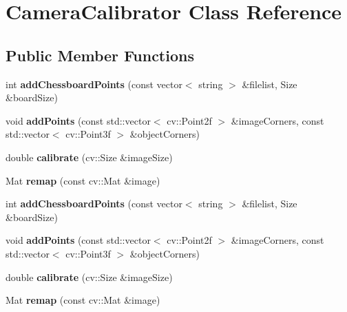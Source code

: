 \hypertarget{class_camera_calibrator}{\section{Camera\-Calibrator Class Reference}
\label{class_camera_calibrator}
}
\subsection*{Public Member Functions}
\begin{DoxyCompactItemize}
\item 
\hypertarget{class_camera_calibrator_a525d73f2da64eb204f7b18869366d3fb}{int {\bfseries add\-Chessboard\-Points} (const vector$<$ string $>$ \&filelist, Size \&board\-Size)}\label{class_camera_calibrator_a525d73f2da64eb204f7b18869366d3fb}

\item 
\hypertarget{class_camera_calibrator_afd58e42b53941ef5e1dade637f90f5b4}{void {\bfseries add\-Points} (const std\-::vector$<$ cv\-::\-Point2f $>$ \&image\-Corners, const std\-::vector$<$ cv\-::\-Point3f $>$ \&object\-Corners)}\label{class_camera_calibrator_afd58e42b53941ef5e1dade637f90f5b4}

\item 
\hypertarget{class_camera_calibrator_acf70d5b8a2e8eb17822e864ad936ae3f}{double {\bfseries calibrate} (cv\-::\-Size \&image\-Size)}\label{class_camera_calibrator_acf70d5b8a2e8eb17822e864ad936ae3f}

\item 
\hypertarget{class_camera_calibrator_af1b2cff3d345a70bbc5421c20847b14f}{Mat {\bfseries remap} (const cv\-::\-Mat \&image)}\label{class_camera_calibrator_af1b2cff3d345a70bbc5421c20847b14f}

\item 
\hypertarget{class_camera_calibrator_a525d73f2da64eb204f7b18869366d3fb}{int {\bfseries add\-Chessboard\-Points} (const vector$<$ string $>$ \&filelist, Size \&board\-Size)}\label{class_camera_calibrator_a525d73f2da64eb204f7b18869366d3fb}

\item 
\hypertarget{class_camera_calibrator_afd58e42b53941ef5e1dade637f90f5b4}{void {\bfseries add\-Points} (const std\-::vector$<$ cv\-::\-Point2f $>$ \&image\-Corners, const std\-::vector$<$ cv\-::\-Point3f $>$ \&object\-Corners)}\label{class_camera_calibrator_afd58e42b53941ef5e1dade637f90f5b4}

\item 
\hypertarget{class_camera_calibrator_acf70d5b8a2e8eb17822e864ad936ae3f}{double {\bfseries calibrate} (cv\-::\-Size \&image\-Size)}\label{class_camera_calibrator_acf70d5b8a2e8eb17822e864ad936ae3f}

\item 
\hypertarget{class_camera_calibrator_aecc1991d46487c6e305f95101e8f9bd2}{Mat {\bfseries remap} (const cv\-::\-Mat \&image)}\label{class_camera_calibrator_aecc1991d46487c6e305f95101e8f9bd2}

\end{DoxyCompactItemize}


